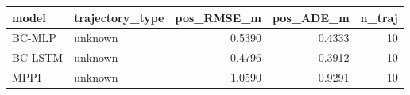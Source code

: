 \begin{tabular}{llrrr}
\toprule
model & trajectory_type & pos_RMSE_m & pos_ADE_m & n_traj \\
\midrule
BC-MLP & unknown & 0.5390 & 0.4333 & 10 \\
BC-LSTM & unknown & 0.4796 & 0.3912 & 10 \\
MPPI & unknown & 1.0590 & 0.9291 & 10 \\
\bottomrule
\end{tabular}
